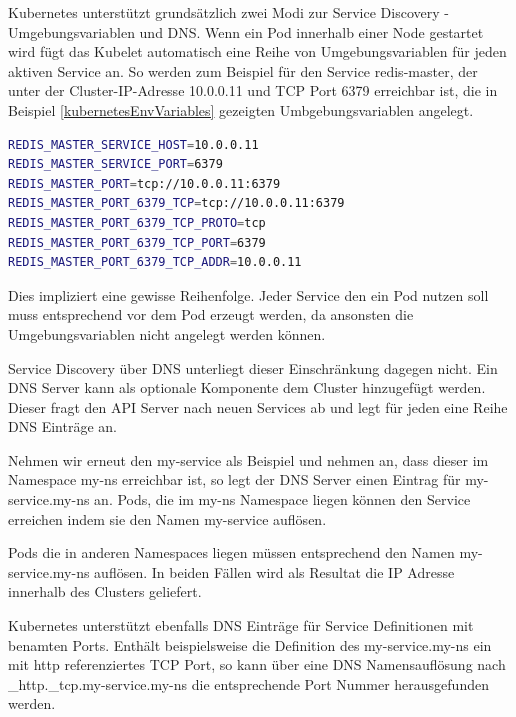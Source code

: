 Kubernetes unterstützt grundsätzlich zwei Modi zur Service Discovery - Umgebungsvariablen und DNS.
Wenn ein Pod innerhalb einer Node gestartet wird fügt das Kubelet automatisch eine Reihe von Umgebungsvariablen für jeden aktiven Service an.
So werden zum Beispiel für den Service \glqq{}redis-master\grqq{}, der unter der Cluster-IP-Adresse 10.0.0.11 und TCP Port 6379 erreichbar ist, die in Beispiel \ref{kubernetesEnvVariables} gezeigten Umbgebungsvariablen angelegt.

\begin{minipage}{\linewidth}
	\begin{lstlisting}[frame=single,caption=Umgebungsvariablen für Service ``redis-master``, label=kubernetesEnvVariables, language=bash]
REDIS_MASTER_SERVICE_HOST=10.0.0.11
REDIS_MASTER_SERVICE_PORT=6379
REDIS_MASTER_PORT=tcp://10.0.0.11:6379
REDIS_MASTER_PORT_6379_TCP=tcp://10.0.0.11:6379
REDIS_MASTER_PORT_6379_TCP_PROTO=tcp
REDIS_MASTER_PORT_6379_TCP_PORT=6379
REDIS_MASTER_PORT_6379_TCP_ADDR=10.0.0.11
	\end{lstlisting}
\end{minipage}

Dies impliziert eine gewisse Reihenfolge.
Jeder Service den ein Pod nutzen soll muss entsprechend vor dem Pod erzeugt werden, da ansonsten die Umgebungsvariablen nicht angelegt werden können.

Service Discovery über DNS unterliegt dieser Einschränkung dagegen nicht.
Ein DNS Server kann als optionale Komponente dem Cluster hinzugefügt werden.
Dieser fragt den API Server nach neuen Services ab und legt für jeden eine Reihe DNS Einträge an.

Nehmen wir erneut den \glqq{}my-service\grqq{} als Beispiel und nehmen an, dass dieser im Namespace \glqq{}my-ns\grqq{} erreichbar ist, so legt der DNS Server einen Eintrag für \glqq{}my-service.my-ns\grqq{} an. 
Pods, die im \glqq{}my-ns\grqq{} Namespace liegen können den Service erreichen indem sie den Namen \glqq{}my-service\grqq{} auflösen.

Pods die in anderen Namespaces liegen müssen entsprechend den Namen \glqq{}my-service.my-ns\grqq{} auflösen.
In beiden Fällen wird als Resultat die IP Adresse innerhalb des Clusters geliefert.

Kubernetes unterstützt ebenfalls DNS Einträge für Service Definitionen mit benamten Ports.
Enthält beispielsweise die Definition des \glqq{}my-service.my-ns\grqq{} ein mit \glqq{}http\grqq{} referenziertes TCP Port, so kann über eine DNS Namensauflösung nach \glqq{}\_http.\_tcp.my-service.my-ns\grqq{} die entsprechende Port Nummer herausgefunden werden.

